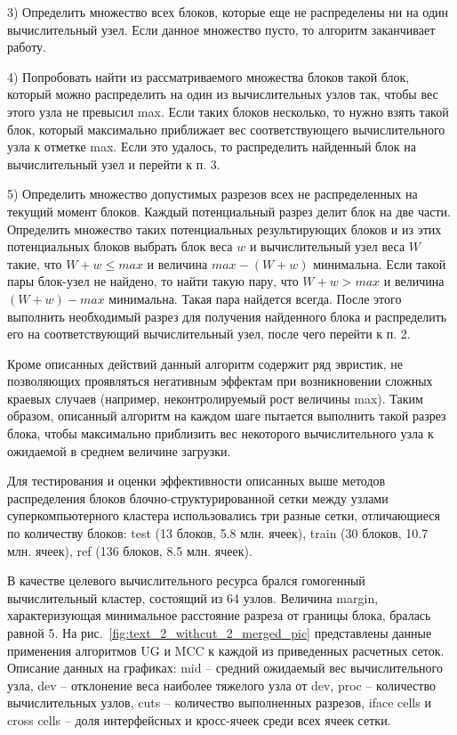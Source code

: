 3) Определить множество всех блоков, которые еще не распределены ни на один вычислительный узел.
Если данное множество пусто, то алгоритм заканчивает работу.

4) Попробовать найти из рассматриваемого множества блоков такой блок, который можно распределить на один из вычислительных узлов так, чтобы вес этого узла не превысил max.
Если таких блоков несколько, то нужно взять такой блок, который максимально приближает вес соответствующего вычислительного узла к отметке max.
Если это удалось, то распределить найденный блок на вычислительный узел и перейти к п. 3.

5) Определить множество допустимых разрезов всех не распределенных на текущий момент блоков.
Каждый потенциальный разрез делит блок на две части.
Определить множество таких потенциальных результирующих блоков и из этих потенциальных блоков выбрать блок веса $w$ и вычислительный узел веса $W$ такие, что $W + w \le max$ и величина $max - (W + w)$ минимальна.
Если такой пары блок-узел не найдено, то найти такую пару, что $W + w > max$ и величина $(W + w) - max$ минимальна.
Такая пара найдется всегда.
После этого выполнить необходимый разрез для получения найденного блока и распределить его на соответствующий вычислительный узел, после чего перейти к п. 2.

Кроме описанных действий данный алгоритм содержит ряд эвристик, не позволяющих проявляться негативным эффектам при возникновении сложных краевых случаев (например, неконтролируемый рост величины max). 
Таким образом, описанный  алгоритм на каждом шаге пытается выполнить такой разрез блока, чтобы максимально приблизить вес некоторого вычислительного узла к ожидаемой в среднем величине загрузки.

Для тестирования и оценки эффективности описанных выше методов распределения блоков блочно-структурированной сетки между узлами суперкомпьютерного кластера использовались три разные сетки, отличающиеся по количеству блоков: test (13 блоков, 5.8 млн. ячеек), train (30 блоков, 10.7 млн. ячеек), ref (136 блоков, 8.5 млн. ячеек).

В качестве целевого вычислительного ресурса брался гомогенный вычислительный кластер, состоящий из 64 узлов.
Величина margin, характеризующая минимальное расстояние разреза от границы блока, бралась равной 5.
На рис.~\ref{fig:text_2_withcut_2_merged_pic} представлены данные применения алгоритмов UG и MCC к каждой из приведенных расчетных сеток. Описание данных на графиках: mid -- средний ожидаемый вес вычислительного узла, dev -- отклонение веса наиболее тяжелого узла от dev, proc -- количество вычислительных узлов, cuts -- количество выполненных разрезов, iface cells и cross cells -- доля интерфейсных и кросс-ячеек среди всех ячеек сетки.

